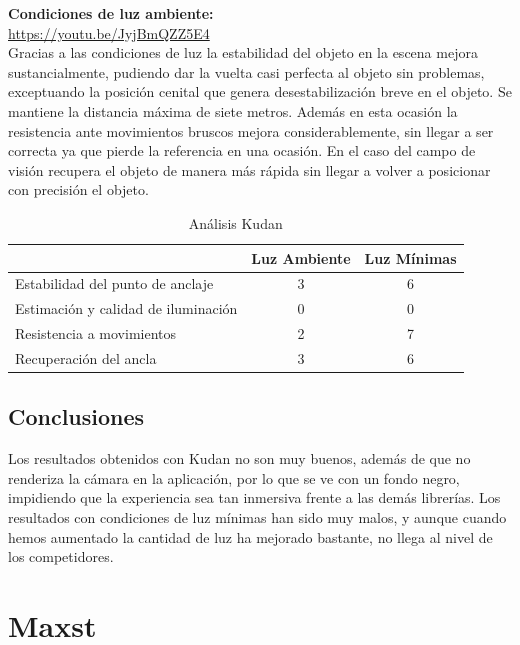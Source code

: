 \textbf{Condiciones de luz ambiente:}\\
\url{https://youtu.be/JyjBmQZZ5E4}\\

Gracias a las condiciones de luz la estabilidad del objeto en la escena mejora sustancialmente, pudiendo dar la vuelta casi perfecta al objeto sin problemas, exceptuando la posición cenital que genera desestabilización breve en el objeto. Se mantiene la distancia máxima de siete metros. Además en esta ocasión la resistencia ante movimientos bruscos mejora considerablemente, sin llegar a ser correcta ya que pierde la referencia en una ocasión. En el caso del campo de visión recupera el objeto de manera más rápida sin llegar a volver a posicionar con precisión el objeto.

\begin{table}[H]
    \centering
     \begin{tabular}{l c c}
    \toprule
          & Luz Ambiente & Luz Mínimas \\
         \midrule
        Estabilidad del punto de anclaje   &3 &6\\
        
        Estimación y calidad de iluminación  &0 &0 \\
        
        Resistencia a movimientos  &2 &7 \\
        
        Recuperación del ancla  &3 &6 \\
      \bottomrule
    \end{tabular}
  
    \caption{Análisis Kudan}
    \label{tab:TKudan}
\end{table}
\subsection{Conclusiones}
Los resultados obtenidos con Kudan no son muy buenos, además de que no renderiza la cámara en la aplicación, por lo que se ve con un fondo negro, impidiendo que la experiencia sea tan inmersiva frente a las demás librerías. Los resultados con condiciones de luz mínimas han sido muy malos, y aunque cuando hemos aumentado la cantidad de luz ha mejorado bastante, no llega al nivel de los competidores.



\section{Maxst}
